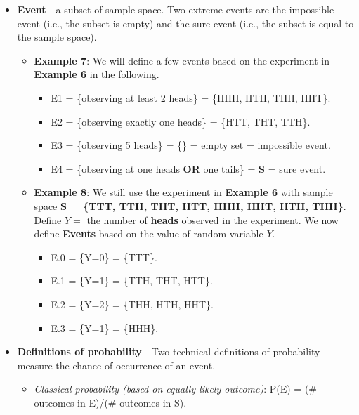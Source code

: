 \documentclass[
]{book}
\providecommand{\tightlist}{%
  \setlength{\itemsep}{0pt}\setlength{\parskip}{0pt}}
\begin{document}
\begin{itemize}
\item
  \textbf{Event} - a subset of sample space. Two extreme events are the impossible event (i.e., the subset is empty) and the sure event (i.e., the subset is equal to the sample space).

  \begin{itemize}
  \tightlist
  \item
    \textbf{Example 7}: We will define a few events based on the experiment in \textbf{Example 6} in the following.

    \begin{itemize}
    \tightlist
    \item
      E1 = \{observing at least 2 heads\} = \{HHH, HTH, THH, HHT\}.
    \item
      E2 = \{observing exactly one heads\} = \{HTT, THT, TTH\}.
    \item
      E3 = \{observing 5 heads\} = \{\} = empty set = impossible event.
    \item
      E4 = \{observing at one heads \textbf{OR} one tails\} = \textbf{S} = sure event.
    \end{itemize}
  \item
    \textbf{Example 8}: We still use the experiment in \textbf{Example 6} with sample space \textbf{S = \{TTT, TTH, THT, HTT, HHH, HHT, HTH, THH\}}. Define \(Y =\) the number of \textbf{heads} observed in the experiment. We now define \textbf{Events} based on the value of random variable \(Y\).

    \begin{itemize}
    \tightlist
    \item
      E.0 = \{Y=0\} = \{TTT\}.
    \item
      E.1 = \{Y=1\} = \{TTH, THT, HTT\}.
    \item
      E.2 = \{Y=2\} = \{THH, HTH, HHT\}.
    \item
      E.3 = \{Y=1\} = \{HHH\}.
    \end{itemize}
  \end{itemize}
\item
  \textbf{Definitions of probability} - Two technical definitions of probability measure the chance of occurrence of an event.

  \begin{itemize}
  \item
    \emph{Classical probability (based on equally likely outcome)}: P(E) = (\# outcomes in E)/(\# outcomes in S).


\end{itemize}
\end{itemize}
\end{document}
